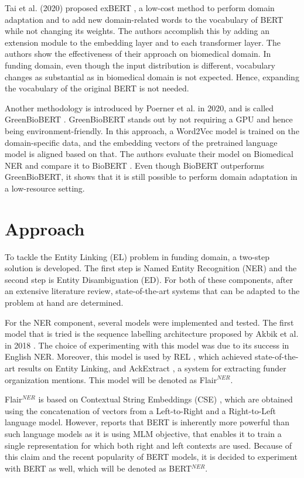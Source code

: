 \documentclass{report}
\theoremstyle{definition}
\theoremstyle{remark}
\begin{document}
Tai et al. (2020) proposed exBERT \cite{exBERT}, a low-cost method to perform domain adaptation and to add new domain-related words to the vocabulary of BERT while not changing its weights. The authors accomplish this by adding an extension module to the embedding layer and to each transformer layer. The authors show the effectiveness of their approach on biomedical domain. In funding domain, even though the input distribution is different, vocabulary changes as substantial as in biomedical domain is not expected. Hence, expanding the vocabulary of the original BERT is not needed. 

Another methodology is introduced by Poerner et al.  in 2020, and is called GreenBioBERT \cite{word2vectoBERT}. GreenBioBERT stands out by not requiring a GPU and hence being environment-friendly. In this approach, a Word2Vec model is trained on the domain-specific data, and the embedding vectors of the pretrained language model is aligned based on that. The authors evaluate their model on Biomedical NER and compare it to BioBERT \cite{biobert}. Even though BioBERT outperforms GreenBioBERT, it shows that it is still possible to perform domain adaptation in a low-resource setting.



\newpage
\chapter{Approach}
\label{chapter:Approach}
To tackle the Entity Linking (EL) problem in funding domain, a two-step solution is developed. The first step is Named Entity Recognition (NER) and the second step is Entity Disambiguation (ED). For both of these components, after an extensive literature review, state-of-the-art systems that can be adapted to the problem at hand are determined.

For the NER component, several models were implemented and tested. The first model that is tried is the sequence labelling architecture proposed by Akbik et al. in 2018 \cite{flairpaper}. The choice of experimenting with this model was due to its success in English NER. Moreover, this model is used by REL \cite{REL}, which achieved state-of-the-art results on Entity Linking, and AckExtract \cite{AckExtract}, a system for extracting funder organization mentions. This model will be denoted as Flair$^{NER}$.

Flair$^{NER}$ is based on Contextual String Embeddings (CSE) \cite{flairpaper}, which are obtained using the concatenation of vectors from a Left-to-Right and a Right-to-Left language model. However, \cite{BERT} reports that BERT is inherently more powerful than such language models as it is using MLM objective, that enables it to train a single representation for which both right and left contexts are used. Because of this claim and the recent popularity of BERT models, it is decided to experiment with BERT as well, which will be denoted as BERT$^{NER}$. 
\end{document}
